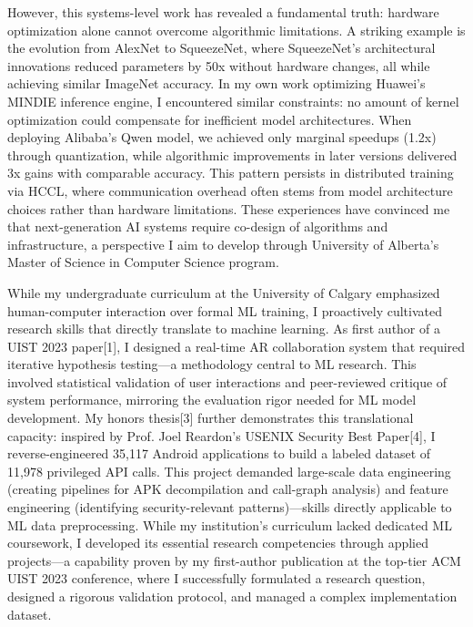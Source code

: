\documentclass{article}
\begin{document}
However, this systems-level work has revealed a fundamental truth: hardware optimization alone cannot overcome algorithmic limitations. A striking example is the evolution from AlexNet to SqueezeNet, where SqueezeNet's architectural innovations reduced parameters by 50x without hardware changes,
 all while achieving similar ImageNet accuracy. In my own work optimizing Huawei's MINDIE inference engine, I encountered similar constraints: no amount of kernel optimization could compensate for inefficient model architectures. When deploying Alibaba's Qwen model, we achieved only marginal speedups (1.2x) through quantization, while algorithmic improvements in later versions delivered 3x gains with comparable accuracy. This pattern persists in distributed training via HCCL, where communication overhead often stems from model architecture choices rather than hardware limitations. These experiences have convinced me that next-generation AI systems require co-design of algorithms and infrastructure, a perspective I aim to develop through University of Alberta's Master of Science in Computer Science program.

While my undergraduate curriculum at the University of Calgary emphasized human-computer interaction over formal ML training, I proactively cultivated research skills that directly translate to machine learning. As first author of a UIST 2023 paper[1], I designed a real-time AR collaboration system that required iterative hypothesis testing—a methodology central to ML research. This involved statistical validation of user interactions and peer-reviewed critique of system performance, mirroring the evaluation rigor needed for ML model development. My honors thesis[3] further demonstrates this translational capacity: inspired by Prof. Joel Reardon's USENIX Security Best Paper[4], I reverse-engineered 35,117 Android applications to build a labeled dataset of 11,978 privileged API calls. This project demanded large-scale data engineering (creating pipelines for APK decompilation and call-graph analysis) and feature engineering (identifying security-relevant patterns)—skills directly applicable to ML data preprocessing. While my institution's curriculum lacked dedicated ML coursework, I developed its essential research competencies through applied projects—a capability proven by my first-author publication at the top-tier ACM UIST 2023 conference, where I successfully formulated a research question, designed a rigorous validation protocol, and managed a complex implementation dataset.
\end{document}
